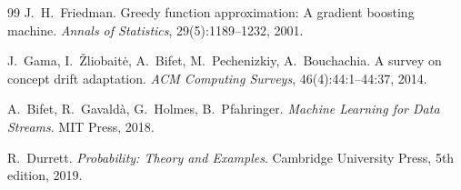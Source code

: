 \documentclass[11pt]{article}
\begin{document}
\begin{thebibliography}{99}
J.~H.~Friedman.
\newblock Greedy function approximation: A gradient boosting machine.
\newblock \emph{Annals of Statistics}, 29(5):1189--1232, 2001.

J.~Gama, I.~\v{Z}liobait\.{e}, A.~Bifet, M.~Pechenizkiy, A.~Bouchachia.
\newblock A survey on concept drift adaptation.
\newblock \emph{ACM Computing Surveys}, 46(4):44:1--44:37, 2014.

A.~Bifet, R.~Gavald\`{a}, G.~Holmes, B.~Pfahringer.
\newblock \emph{Machine Learning for Data Streams}.
\newblock MIT Press, 2018.

R.~Durrett.
\newblock \emph{Probability: Theory and Examples}.
\newblock Cambridge University Press, 5th edition, 2019.

\end{thebibliography}
\end{document}
